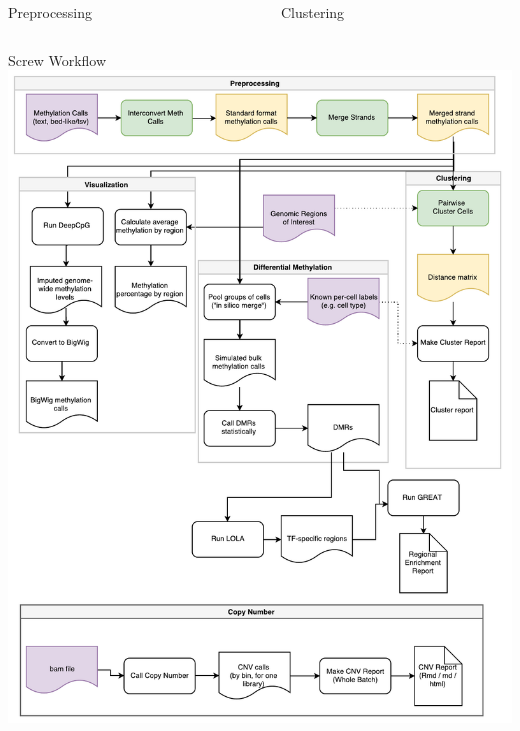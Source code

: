 \documentclass{beamer}
\begin{document}
\begin{frame}
\begin{columns}[t]
\begin{column}{.65\textwidth}
\begin{columns}[t,totalwidth=\textwidth]
\begin{column}{.48\textwidth}
	\begin{block}{Preprocessing}
	
	\end{block}

	\end{column}

	\begin{column}{.48\textwidth}
	\begin{block}{Clustering}
	
	\end{block}

	\end{column}
  \end{columns}

	\begin{block}{Screw Workflow}
  \includegraphics[width=\textwidth]{figures/workflow_diagram.pdf}
  \end{block}
  \begin{columns}[t,totalwidth=\textwidth]



\end{columns}
\end{column}
\end{columns}
\end{frame}
\end{document}
